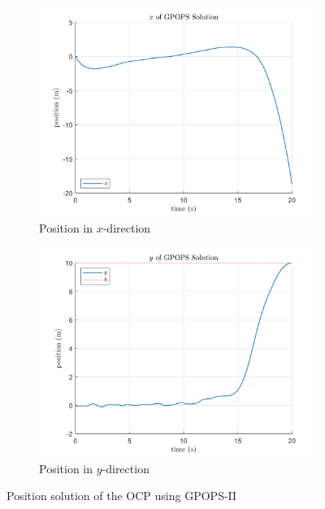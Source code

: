 \begin{figure}[ht]
  \centering
  \begin{subfigure}[b]{0.49\linewidth}
    \includegraphics[width=\linewidth]{figures/SolX.png}
    \caption{Position in $x$-direction}
    \label{fig:ocp1_x}
  \end{subfigure}
  \hfill
  \begin{subfigure}[b]{0.49\linewidth}
    \includegraphics[width=\linewidth]{figures/SolY.png}
    \caption{Position in $y$-direction}
    \label{fig:ocp1_y}
  \end{subfigure}
  \caption{Position solution of the OCP using GPOPS-II}
  \label{fig:ocp1_sol}
\end{figure}

